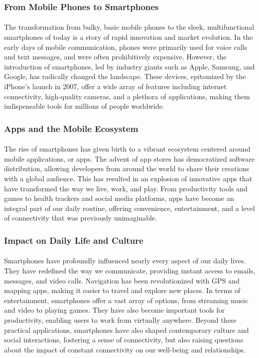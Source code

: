\documentclass[a4paper,12pt]{book}
\begin{document}
\subsubsection*{From Mobile Phones to Smartphones}
\paragraph{}
The transformation from bulky, basic mobile phones to the sleek, multifunctional smartphones of today is a story of rapid innovation and market evolution. In the early days of mobile communication, phones were primarily used for voice calls and text messages, and were often prohibitively expensive. However, the introduction of smartphones, led by industry giants such as Apple, Samsung, and Google, has radically changed the landscape. These devices, epitomized by the iPhone's launch in 2007, offer a wide array of features including internet connectivity, high-quality cameras, and a plethora of applications, making them indispensable tools for millions of people worldwide.

\subsubsection*{Apps and the Mobile Ecosystem}
\paragraph{}
The rise of smartphones has given birth to a vibrant ecosystem centered around mobile applications, or apps. The advent of app stores has democratized software distribution, allowing developers from around the world to share their creations with a global audience. This has resulted in an explosion of innovative apps that have transformed the way we live, work, and play. From productivity tools and games to health trackers and social media platforms, apps have become an integral part of our daily routine, offering convenience, entertainment, and a level of connectivity that was previously unimaginable.

\subsubsection*{Impact on Daily Life and Culture}
\paragraph{}
Smartphones have profoundly influenced nearly every aspect of our daily lives. They have redefined the way we communicate, providing instant access to emails, messages, and video calls. Navigation has been revolutionized with GPS and mapping apps, making it easier to travel and explore new places. In terms of entertainment, smartphones offer a vast array of options, from streaming music and video to playing games. They have also become important tools for productivity, enabling users to work from virtually anywhere. Beyond these practical applications, smartphones have also shaped contemporary culture and social interactions, fostering a sense of connectivity, but also raising questions about the impact of constant connectivity on our well-being and relationships.
\end{document}
